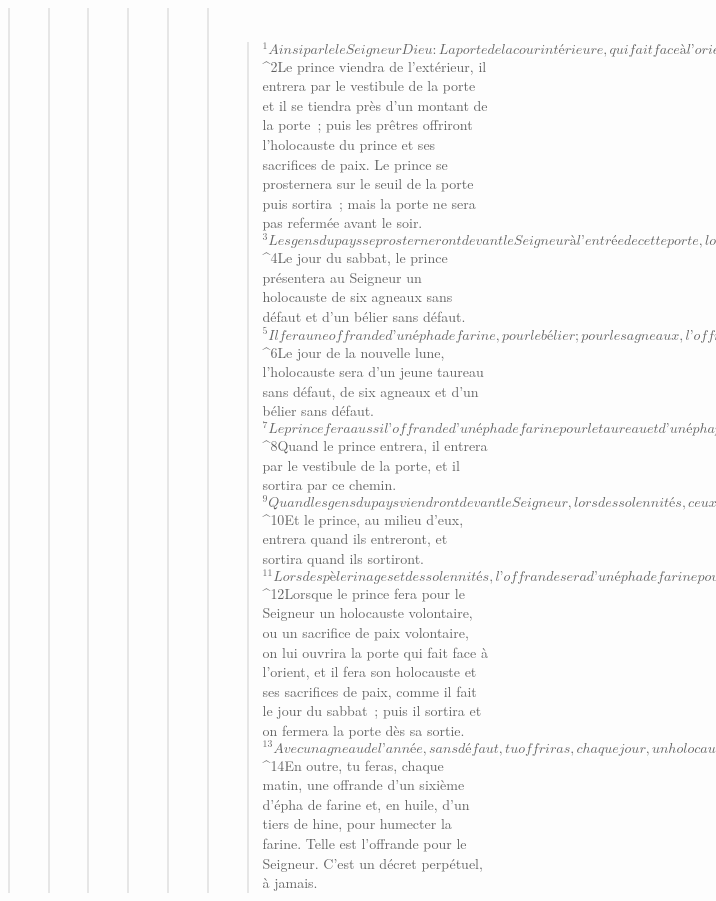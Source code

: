\begin{verse}
\begin{verse}
\begin{verse}
\begin{verse}
\begin{verse}
\begin{verse}
         
      \bchapter{}
      \begin{verse}
${}^{1}Ainsi parle le Seigneur Dieu : La porte de la cour intérieure, qui fait face à l’orient, sera fermée durant les six jours de travail ; mais, le jour du sabbat, elle sera ouverte ; elle sera également ouverte au jour de la nouvelle lune. 
${}^{2}Le prince viendra de l’extérieur, il entrera par le vestibule de la porte et il se tiendra près d’un montant de la porte ; puis les prêtres offriront l’holocauste du prince et ses sacrifices de paix. Le prince se prosternera sur le seuil de la porte puis sortira ; mais la porte ne sera pas refermée avant le soir. 
${}^{3}Les gens du pays se prosterneront devant le Seigneur à l’entrée de cette porte, lors des sabbats et des nouvelles lunes. 
${}^{4}Le jour du sabbat, le prince présentera au Seigneur un holocauste de six agneaux sans défaut et d’un bélier sans défaut. 
${}^{5}Il fera une offrande d’un épha de farine, pour le bélier ; pour les agneaux, l’offrande sera laissée à sa discrétion ; il ajoutera un hine d’huile par épha. 
${}^{6}Le jour de la nouvelle lune, l’holocauste sera d’un jeune taureau sans défaut, de six agneaux et d’un bélier sans défaut. 
${}^{7}Le prince fera aussi l’offrande d’un épha de farine pour le taureau et d’un épha pour le bélier ; pour les agneaux, ce sera selon ses moyens ; il ajoutera un hine d’huile par épha.
${}^{8}Quand le prince entrera, il entrera par le vestibule de la porte, et il sortira par ce chemin. 
${}^{9}Quand les gens du pays viendront devant le Seigneur, lors des solennités, ceux qui entreront par la porte nord, pour se prosterner, sortiront par la porte du midi, et ceux qui entreront par la porte du midi sortiront par la porte du nord. On ne reprendra pas la porte par laquelle on est entré ; on sortira à l’opposé. 
${}^{10}Et le prince, au milieu d’eux, entrera quand ils entreront, et sortira quand ils sortiront.
${}^{11}Lors des pèlerinages et des solennités, l’offrande sera d’un épha de farine pour le taureau et d’un épha pour le bélier ; pour les agneaux, ce sera laissé à sa discrétion ; il ajoutera un hine d’huile par épha. 
${}^{12}Lorsque le prince fera pour le Seigneur un holocauste volontaire, ou un sacrifice de paix volontaire, on lui ouvrira la porte qui fait face à l’orient, et il fera son holocauste et ses sacrifices de paix, comme il fait le jour du sabbat ; puis il sortira et on fermera la porte dès sa sortie.
${}^{13}Avec un agneau de l’année, sans défaut, tu offriras, chaque jour, un holocauste au Seigneur ; tu le feras chaque matin. 
${}^{14}En outre, tu feras, chaque matin, une offrande d’un sixième d’épha de farine et, en huile, d’un tiers de hine, pour humecter la farine. Telle est l’offrande pour le Seigneur. C’est un décret perpétuel, à jamais. 

\end{verse}
\end{verse}
\end{verse}
\end{verse}
\end{verse}
\end{verse}
\end{verse}
